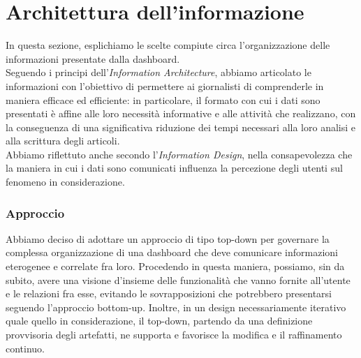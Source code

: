 \section{Architettura dell'informazione}
\label{s:architettura-informazione}

In questa sezione, esplichiamo le scelte compiute circa l'organizzazione delle informazioni presentate dalla dashboard.\\
Seguendo i principi dell'\textit{Information Architecture}, abbiamo articolato le informazioni con l'obiettivo di permettere ai giornalisti di comprenderle in maniera efficace ed efficiente: in particolare, il formato con cui i dati sono presentati è affine alle loro necessità informative e alle attività che realizzano, con la conseguenza di una significativa riduzione dei tempi necessari alla loro analisi e alla scrittura degli articoli.\\
\noindent
Abbiamo riflettuto anche secondo l'\textit{Information Design}, nella consapevolezza che la maniera in cui i dati sono comunicati influenza la percezione degli utenti sul fenomeno in considerazione.

\subsubsection{Approccio}
\label{sss:approccio}
Abbiamo deciso di adottare un approccio di tipo top-down per governare la complessa organizzazione di una dashboard che deve comunicare informazioni eterogenee e correlate fra loro.
Procedendo in questa maniera, possiamo, sin da subito, avere una visione d'insieme delle funzionalità che vanno fornite all'utente e le relazioni fra esse, evitando le sovrapposizioni che potrebbero presentarsi seguendo l'approccio bottom-up.
Inoltre, in un design necessariamente iterativo quale quello in considerazione, il top-down, partendo da una definizione provvisoria degli artefatti, ne supporta e favorisce la modifica e il raffinamento continuo.

